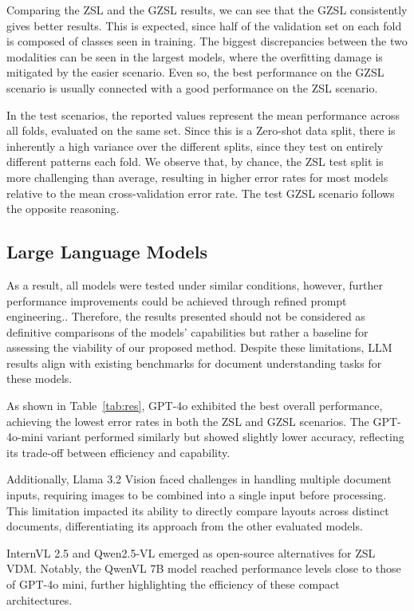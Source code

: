 Comparing the \gls{ZSL} and the \gls{GZSL} results, we can see that the \gls{GZSL} consistently gives better results. This is expected, since half of the validation set on each fold is composed of classes seen in training. The biggest discrepancies between the two modalities can be seen in the largest models, where the overfitting damage is mitigated by the easier scenario. Even so, the best performance on the \gls{GZSL} scenario is usually connected with a good performance on the \gls{ZSL} scenario.

In the test scenarios, the reported values represent the mean performance across all folds, evaluated on the same set. Since this is a Zero-shot data split, there is inherently a high variance over the different splits, since they test on entirely different patterns each fold. We observe that, by chance, the \gls{ZSL} test split is more challenging than average, resulting in higher error rates for most models relative to the mean cross-validation error rate. The test \gls{GZSL} scenario follows the opposite reasoning.

\subsection{Large Language Models}
\label{sec:llm_result}

As a result, all models were tested under similar conditions, however, further performance improvements could be achieved through refined prompt engineering.. Therefore, the results presented should not be considered as definitive comparisons of the models' capabilities but rather a baseline for assessing the viability of our proposed method. Despite these limitations, \gls{LLM} results align with existing benchmarks for document understanding tasks for these models. 

As shown in Table~\ref{tab:res}, GPT-4o exhibited the best overall performance, achieving the lowest error rates in both the \gls{ZSL} and \gls{GZSL} scenarios. The GPT-4o-mini variant performed similarly but showed slightly lower accuracy, reflecting its trade-off between efficiency and capability.

Additionally, Llama 3.2 Vision faced challenges in handling multiple document inputs, requiring images to be combined into a single input before processing. This limitation impacted its ability to directly compare layouts across distinct documents, differentiating its approach from the other evaluated models.

InternVL 2.5 and Qwen2.5-VL emerged as open-source alternatives for  \gls{ZSL} \gls{VDM}. Notably, the QwenVL 7B model reached performance levels close to those of GPT-4o mini, further highlighting the efficiency of these compact architectures.

